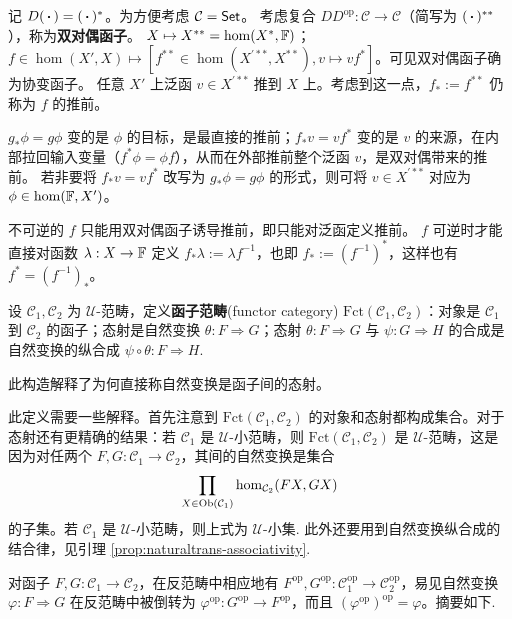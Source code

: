 \begin{example}\label{eg:double-dual-functor}
	记 $D(\oo)=(\oo)^*$。为方便考虑 $\mathcal{C}=\mathsf{Set}$。
	考虑复合 $DD^\mathrm{op}:\mathcal{C}\to\mathcal{C}$（简写为 $(\oo)^{**}$），称为\textbf{双对偶函子}。
	$X\mapsto X^{**}=\hom(X^*,\mathbb{F})$；
	$f\in\hom(X', X)\mapsto [f^{**}\in\hom(X^{\prime **},X^{**}), v\mapsto v f^*]$。可见双对偶函子确为协变函子。
	任意 $X'$ 上泛函 $v\in X^{\prime **}$ 推到 $X$ 上。考虑到这一点，$f_* := f^{**}$ 仍称为 $f$ 的推前。
	
	$g_*\phi=g\phi$ 变的是 $\phi$ 的目标，是最直接的推前；$f_*v=vf^*$ 变的是 $v$ 的来源，在内部拉回输入变量（$f^*\phi=\phi f$），从而在外部推前整个泛函 $v$，是双对偶带来的推前。
	若非要将 $f_*v=vf^*$ 改写为 $g_*\phi=g\phi$ 的形式，则可将 $v\in X^{\prime **}$ 对应为 $\phi \in\hom(\mathbb{F},X')$。
\end{example}

\begin{remark}
    不可逆的 $f$ 只能用双对偶函子诱导推前，即只能对泛函定义推前。
    $f$ 可逆时才能直接对函数 $\lambda:X\to\mathbb{F}$ 定义 $f_*\lambda:=\lambda f^{-1}$，也即 $f_*:=(f^{-1})^*$，这样也有 $f^*=(f^{-1})_*$。
\end{remark}

\begin{definition}
	设 $\mathcal{C}_1, \mathcal{C}_2$ 为 $\mathcal{U}$-范畴，定义\textbf{函子范畴}(functor category) $\mathrm{Fct}(\mathcal{C}_1, \mathcal{C}_2)$：对象是 $\mathcal{C}_1$ 到 $\mathcal{C}_2$ 的函子；态射是自然变换 $\theta: F \Rightarrow G$；态射 $\theta: F \Rightarrow G$ 与 $\psi: G \Rightarrow H$ 的合成是自然变换的纵合成 $\psi \circ \theta: F \Rightarrow H$.
\end{definition}
此构造解释了为何直接称自然变换是函子间的态射。

\begin{remark}
	此定义需要一些解释。首先注意到 $\mathrm{Fct}(\mathcal{C}_1, \mathcal{C}_2)$ 的对象和态射都构成集合。对于态射还有更精确的结果：若 $\mathcal{C}_1$ 是 $\mathcal{U}$-小范畴，则 $\mathrm{Fct}(\mathcal{C}_1, \mathcal{C}_2)$ 是 $\mathcal{U}$-范畴，这是因为对任两个 $F, G: \mathcal{C}_1 \to \mathcal{C}_2$，其间的自然变换是集合
	\[ \prod_{X \in \operatorname{Ob}(\mathcal{C}_1)} \hom_{\mathcal{C}_2} (FX, GX) \]
	的子集。若 $\mathcal{C}_1$ 是 $\mathcal{U}$-小范畴，则上式为 $\mathcal{U}$-小集.
	此外还要用到自然变换纵合成的结合律，见引理 \ref{prop:naturaltrans-associativity}.
\end{remark}

对函子 $F, G : \mathcal{C}_1 \to \mathcal{C}_2$，在反范畴中相应地有 $F^\mathrm{op}, G^\mathrm{op}: \mathcal{C}_1^\mathrm{op} \to \mathcal{C}_2^\mathrm{op}$，易见自然变换 $\varphi: F \Rightarrow G$ 在反范畴中被倒转为 $\varphi^\mathrm{op}: G^\mathrm{op} \to F^\mathrm{op}$，而且 $(\varphi^{\mathrm{op}})^{\mathrm{op}} = \varphi$。摘要如下.

